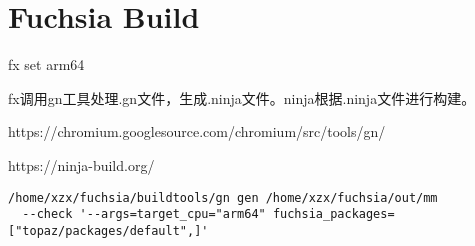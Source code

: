 \section{Fuchsia Build}

fx set arm64

fx调用gn工具处理.gn文件，生成.ninja文件。ninja根据.ninja文件进行构建。

https://chromium.googlesource.com/chromium/src/tools/gn/

https://ninja-build.org/

\begin{verbatim}
/home/xzx/fuchsia/buildtools/gn gen /home/xzx/fuchsia/out/mm 
  --check '--args=target_cpu="arm64" fuchsia_packages=["topaz/packages/default",]'
\end{verbatim}